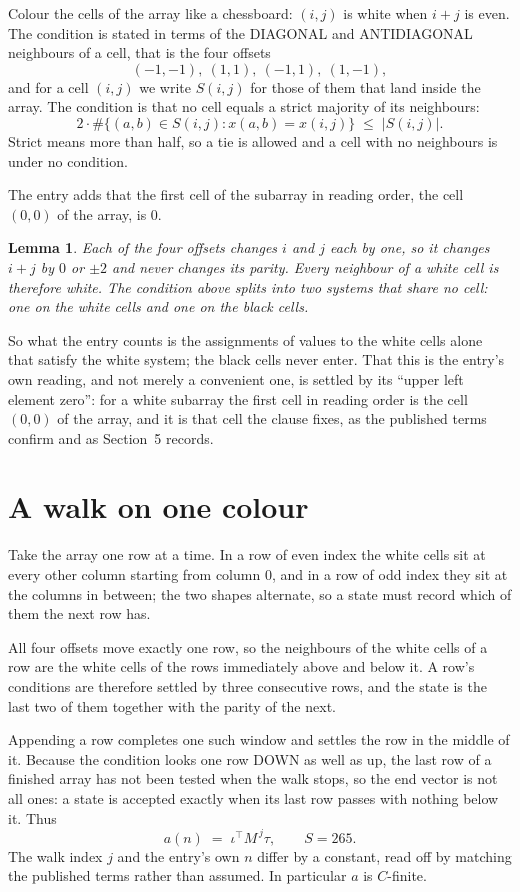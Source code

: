 \documentclass[11pt,a4paper]{article}
\theoremstyle{plain}
\newtheorem{lemma}[theorem]{Lemma}
\theoremstyle{definition}
\begin{document}
Colour the cells of the array like a chessboard: $(i,j)$ is white when $i+j$ is even. The
condition is stated in terms of the DIAGONAL and ANTIDIAGONAL neighbours of a cell, that is the
four offsets
\[
(-1,-1),\ (1,1),\ (-1,1),\ (1,-1),
\]
and for a cell $(i,j)$ we write $S(i,j)$ for those of them that land inside the array. The
condition is that no cell equals a strict majority of its neighbours:
\[
2\cdot\#\{(a,b)\in S(i,j) : x(a,b)=x(i,j)\}\;\le\;|S(i,j)| .
\]
Strict means more than half, so a tie is allowed and a cell with no neighbours is under no condition.

The entry adds that the first cell of the subarray in reading order, the cell $(0,0)$ of the array, is $0$.

\begin{lemma}\label{lem:split}
Each of the four offsets changes $i$ and $j$ each by one, so it changes $i+j$ by $0$ or $\pm2$
and never changes its parity. Every neighbour of a white cell is therefore white. The condition
above splits into two systems that share no cell: one on the white cells and one on the black
cells.
\end{lemma}

So what the entry counts is the assignments of values to the white cells alone that satisfy the
white system; the black cells never enter. That this is the entry's own reading, and not
merely a convenient one, is settled by its ``upper left element zero'': for a white subarray the
first cell in reading order is the cell $(0,0)$ of the array, and it is that cell the
clause fixes, as the published terms confirm and as Section~5 records.

\section{A walk on one colour}

Take the array one row at a time. In a row of even index the white cells sit at every other
column starting from column $0$, and in a row of odd index they sit at the columns in
between; the two shapes alternate, so a state must record which of them the next row has.

All four offsets move exactly one row, so the neighbours of the white cells of a row are the
white cells of the rows immediately above and below it. A row's conditions are therefore settled
by three consecutive rows, and the state is the last two of them together with the parity of the
next.

Appending a row completes one such window and settles the row in the middle of it. Because the
condition looks one row DOWN as well as up, the last row of a finished array has not been tested
when the walk stops, so the end vector is not all ones: a state is accepted exactly when its
last row passes with nothing below it. Thus
\[
a(n)\;=\;\iota^{\!\top}M^{\,j}\tau ,\qquad S=265.
\]
The walk index $j$ and the entry's own $n$ differ by a constant, read off by matching the
published terms rather than assumed. In particular $a$ is $C$-finite.
\end{document}
